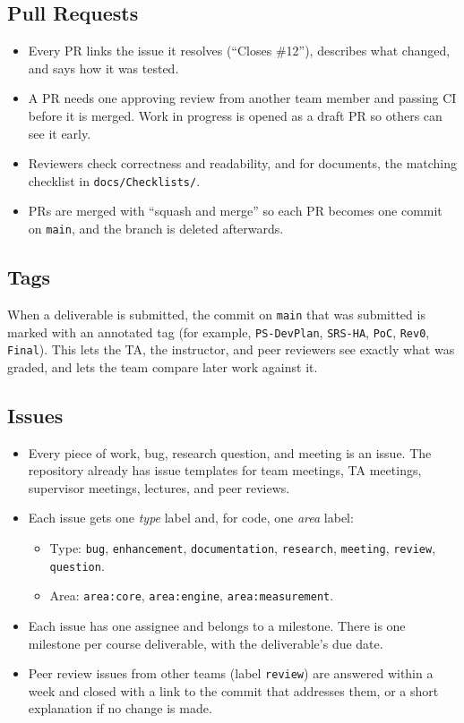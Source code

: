 \documentclass{article}
\begin{document}
\subsection{Pull Requests}

\begin{itemize}
  \item Every PR links the issue it resolves (``Closes \#12''), describes
  what changed, and says how it was tested.
  \item A PR needs one approving review from another team member and
  passing CI before it is merged. Work in progress is opened as a draft PR
  so others can see it early.
  \item Reviewers check correctness and readability, and for documents,
  the matching checklist in \texttt{docs/Checklists/}.
  \item PRs are merged with ``squash and merge'' so each PR becomes one
  commit on \texttt{main}, and the branch is deleted afterwards.
\end{itemize}

\subsection{Tags}

When a deliverable is submitted, the commit on \texttt{main} that was
submitted is marked with an annotated tag (for example, \texttt{PS-DevPlan},
\texttt{SRS-HA}, \texttt{PoC}, \texttt{Rev0}, \texttt{Final}). This lets
the TA, the instructor, and peer reviewers see exactly what was graded, and
lets the team compare later work against it.

\subsection{Issues}

\begin{itemize}
  \item Every piece of work, bug, research question, and meeting is an
  issue. The repository already has issue templates for team meetings, TA
  meetings, supervisor meetings, lectures, and peer reviews.
  \item Each issue gets one \emph{type} label and, for code, one
  \emph{area} label:
  \begin{itemize}[noitemsep]
    \item Type: \texttt{bug}, \texttt{enhancement}, \texttt{documentation},
    \texttt{research}, \texttt{meeting}, \texttt{review}, \texttt{question}.
    \item Area: \texttt{area:core}, \texttt{area:engine},
    \texttt{area:measurement}.
  \end{itemize}
  \item Each issue has one assignee and belongs to a milestone. There is
  one milestone per course deliverable, with the deliverable's due date.
  \item Peer review issues from other teams (label \texttt{review}) are
  answered within a week and closed with a link to the commit that
  addresses them, or a short explanation if no change is made.
\end{itemize}
\end{document}
